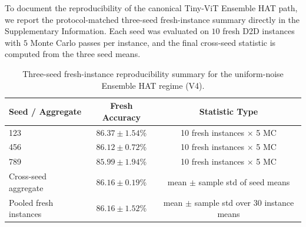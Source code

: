 To document the reproducibility of the canonical Tiny-ViT Ensemble HAT path, we report the protocol-matched three-seed fresh-instance summary directly in the Supplementary Information. Each seed was evaluated on \(10\) fresh D2D instances with \(5\) Monte Carlo passes per instance, and the final cross-seed statistic is computed from the three seed means.

\begin{table}[ht]
\centering
\caption{Three-seed fresh-instance reproducibility summary for the uniform-noise Ensemble HAT regime (V4).}
\label{tab:v4-three-seed-summary}
\begin{tabular}{lcc}
\toprule
\textbf{Seed / Aggregate} & \textbf{Fresh Accuracy} & \textbf{Statistic Type} \\
\midrule
123 & \(86.37\pm1.54\)\% & 10 fresh instances \(\times\) 5 MC \\
456 & \(86.12\pm0.72\)\% & 10 fresh instances \(\times\) 5 MC \\
789 & \(85.99\pm1.94\)\% & 10 fresh instances \(\times\) 5 MC \\
\midrule
Cross-seed aggregate & \(\mathbf{86.16\pm0.19}\)\% & mean \(\pm\) sample std of seed means \\
Pooled fresh instances & \(86.16\pm1.52\)\% & mean \(\pm\) sample std over 30 instance means \\
\bottomrule
\end{tabular}
\end{table}

\FloatBarrier


